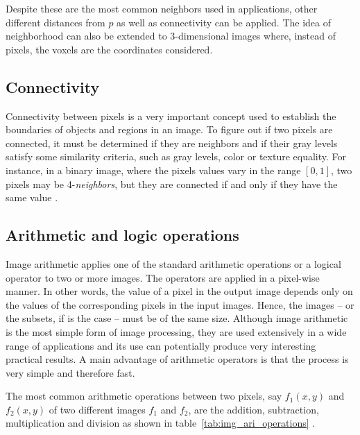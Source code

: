 Despite these are the most common neighbors used in applications, other different distances from $p$ as well as connectivity can be applied. The idea of neighborhood can also be extended to 3-dimensional images where, instead of pixels, the voxels are the coordinates considered.


\subsection{Connectivity}
\label{sec:connectivity}
Connectivity between pixels is a very important concept used to establish the boundaries of objects and regions in an image. To figure out if two pixels are connected, it must be determined if they are neighbors and if their gray levels satisfy some similarity criteria, such as gray levels, color or texture equality. For instance, in a binary image, where the pixels values vary in the range $[0, 1]$, two pixels may be 4-\textit{neighbors}, but they are connected if and only if they have the same value \citep{gonzalez:02}.


\subsection{Arithmetic and logic operations}
\label{sec:ari_logic_operations}
Image arithmetic applies one of the standard arithmetic operations or a logical operator to two or more images. The operators are applied in a pixel-wise manner. In other words, the value of a pixel in the output image depends only on the values of the corresponding pixels in the input images. Hence, the images -- or the subsets, if is the case -- must be of the same size. Although image arithmetic is the most simple form of image processing, they are used extensively in a wide range of applications and its use can potentially produce very interesting practical results. A main advantage of arithmetic operators is that the process is very simple and therefore fast.

The most common arithmetic operations between two pixels, say $f_1(x, y)$ and $f_2(x, y)$ of two different images $f_1$ and $f_2$, are the addition, subtraction, multiplication and division as shown in table~\ref{tab:img_ari_operations} \citep{pedrini:08}.

